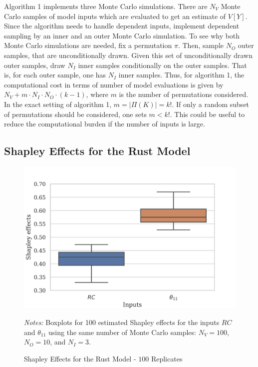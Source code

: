 Algorithm 1 implements three Monte Carlo simulations. There are $N_V$ Monte Carlo samples of model inputs which are evaluated to get an estimate of $V[Y]$. Since the algorithm needs to handle dependent inputs, \citet{SNS16} implement dependent sampling by an inner and an outer Monte Carlo simulation. To see why both Monte Carlo simulations are needed, fix a permutation $\pi$. Then, sample $N_O$ outer samples, that are unconditionally drawn. Given this set of unconditionally drawn outer samples, draw $N_I$ inner samples conditionally on the outer samples. That is, for each outer sample, one has $N_I$ inner samples. Thus, for algorithm 1, the computational cost in terms of number of model evaluations is given by $N_V+m \cdot N_I \cdot N_O \cdot (k-1)$, where $m$ is the number of permutations considered. In the exact setting of algorithm 1, $m=\vert \Pi(K) \vert=k!$. If only a random subset of permutations should be considered, one sets $m<k!$. This could be useful to reduce the computational burden if the number of inputs is large.

\subsection{Shapley Effects for the Rust Model} \label{shapley_rust_model}

\begin{figure}[t]
	\caption{Shapley Effects for the Rust Model - $100$ Replicates}
    \label{boxplot_shapley}
	\vspace*{-4mm}
	\begin{centering}
	\includegraphics[scale=0.9]{../figures/boxplot_shapley_effects_100.png}
	\end{centering}

	\small
	\textit{Notes:} Boxplots for 100 estimated Shapley effects for the inputs $RC$ and $\theta_{11}$ using the same number of Monte Carlo samples: $N_V=100$, $N_O=10$, and $N_I=3$.
\end{figure}

